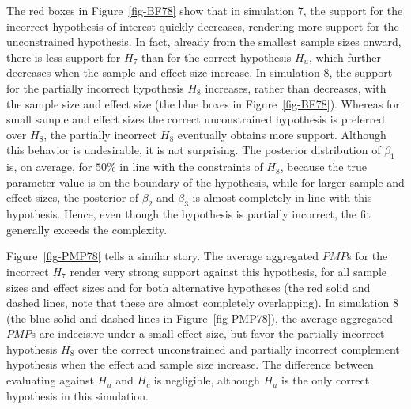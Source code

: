 \documentclass[
]{interact}
\begin{document}
                    The red boxes in Figure~\ref{fig-BF78} show that in simulation 7, the
                    support for the incorrect hypothesis of interest quickly decreases,
                    rendering more support for the unconstrained hypothesis. In fact,
                    already from the smallest sample sizes onward, there is less support for
                    \(H_7\) than for the correct hypothesis \(H_u\), which further decreases
                    when the sample and effect size increase. In simulation 8, the support
                    for the partially incorrect hypothesis \(H_8\) increases, rather than
                    decreases, with the sample size and effect size (the blue boxes in
                                                                     Figure~\ref{fig-BF78}). Whereas for small sample and effect sizes the
                    correct unconstrained hypothesis is preferred over \(H_8\), the
                    partially incorrect \(H_8\) eventually obtains more support. Although
                    this behavior is undesirable, it is not surprising. The posterior
                    distribution of \(\beta_1\) is, on average, for \(50\%\) in line with
                    the constraints of \(H_8\), because the true parameter value is on the
                    boundary of the hypothesis, while for larger sample and effect sizes,
                    the posterior of \(\beta_2\) and \(\beta_3\) is almost completely in
                    line with this hypothesis. Hence, even though the hypothesis is
                    partially incorrect, the fit generally exceeds the complexity.
                    
                    Figure~\ref{fig-PMP78} tells a similar story. The average aggregated
                    \(PMP\)s for the incorrect \(H_7\) render very strong support against
                    this hypothesis, for all sample sizes and effect sizes and for both
                    alternative hypotheses (the red solid and dashed lines, note that these
                                            are almost completely overlapping). In simulation 8 (the blue solid and
                                                                                                 dashed lines in Figure~\ref{fig-PMP78}), the average aggregated \(PMP\)s
                    are indecisive under a small effect size, but favor the partially
                    incorrect hypothesis \(H_8\) over the correct unconstrained and
                    partially incorrect complement hypothesis when the effect and sample
                    size increase. The difference between evaluating against \(H_u\) and
                    \(H_c\) is negligible, although \(H_u\) is the only correct hypothesis
                    in this simulation.
                    
\end{document}
